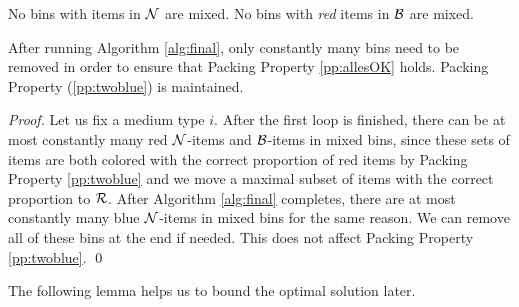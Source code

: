 \begin{pproperty}
\label{pp:allesOK}
No bins with items in $\mathcal{N}$ are mixed. 
No bins with \emph{red} items in $\mathcal{B}$ are mixed.
\end{pproperty}

\begin{lemma}
	\label{lem:pp12}
	After running Algorithm \ref{alg:final}, only constantly many bins need to be removed in order to ensure that Packing Property \ref{pp:allesOK} holds.
	Packing Property (\ref{pp:twoblue}) is maintained.
\end{lemma}

\begin{proof}
Let us fix a medium type $i$.
After the first loop is finished, there can be at most constantly many red $\mathcal{N}$-items and $\mathcal{B}$-items in mixed bins, 
since these sets of items are both colored with the correct proportion of
red items by Packing Property \ref{pp:twoblue} and we move a maximal subset of items with the correct proportion to $\mathcal{R}$. 
After Algorithm \ref{alg:final} completes, there are at most constantly many blue $\mathcal{N}$-items in mixed bins
for the same reason.
We can remove all of these bins at the end if needed. This does not affect Packing Property \ref{pp:twoblue}.
\qed\end{proof}

The following lemma helps us to bound the optimal solution later.

